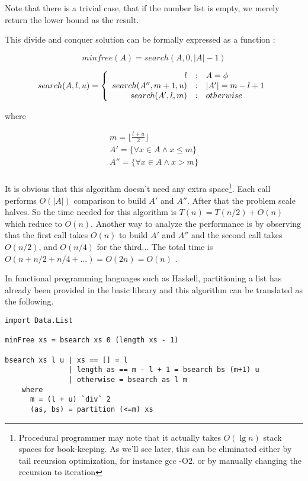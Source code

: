 \documentclass{article}
\begin{document}
Note that there is a trivial case, that if the number list is
empty, we merely return the lower bound as the result.

This divide and conquer solution can be formally expressed
as a function :

\[
minfree(A) = search(A, 0, |A|-1)
\]

\[
search(A, l, u) = \left \{
       \begin{array}
       {r@{\quad:\quad}l}
       l & A = \phi \\
       search(A'', m+1, u) &  |A'| = m - l + 1 \\
       search(A',  l, m) & otherwise
       \end{array}
\right.
\]

where

\[ \begin{array}{l}
m = \displaystyle \lfloor \frac{l+u}{2} \rfloor \\
A'  = \{ \forall x \in A \wedge x \leq m \} \\
A'' = \{ \forall x \in A \wedge x > m \} \\
\end{array} \]

It is obvious that this algorithm doesn't need any extra
space\footnote{Procedural programmer may note that it
actually takes $O(\lg n)$ stack spaces for book-keeping. As
we'll see later, this can be eliminated either by tail
recursion optimization, for instance gcc -O2. or by manually
changing the recursion to iteration}. Each call
performs $O(|A|)$ comparison to build $A'$ and $A''$.
After that the problem scale halves.
So the time needed for this algorithm is $T(n) = T(n/2) + O(n)$
which reduce to $O(n)$. Another way to analyze the performance
is by observing that the first call takes $O(n)$
to build $A'$ and $A''$ and the second call takes
$O(n/2)$, and $O(n/4)$ for the third... The total
time is $O(n + n/2 + n/4 + ...) = O(2n) = O(n)$ .

In functional programming languages such as Haskell,
partitioning a list has already been provided in the basic library
and this algorithm can be translated as the following.

\lstset{language=Haskell}
\begin{lstlisting}
import Data.List

minFree xs = bsearch xs 0 (length xs - 1)

bsearch xs l u | xs == [] = l
               | length as == m - l + 1 = bsearch bs (m+1) u
               | otherwise = bsearch as l m
    where
      m = (l + u) `div` 2
      (as, bs) = partition (<=m) xs
\end{lstlisting}
\end{document}
